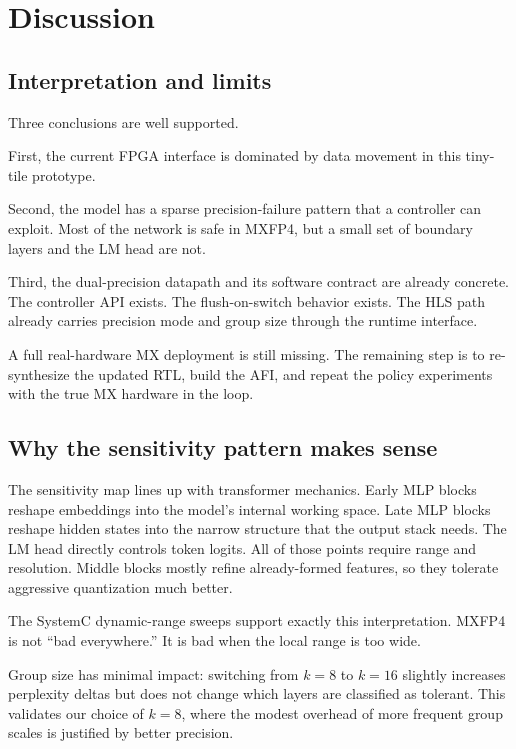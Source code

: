 \documentclass[11pt,a4paper]{article}
\begin{document}
\section{Discussion}

\subsection{Interpretation and limits}

Three conclusions are well supported.

First, the current FPGA interface is dominated by data movement in this tiny-tile prototype.

Second, the model has a sparse precision-failure pattern that a controller can exploit. Most of the network is safe in MXFP4, but a small set of boundary layers and the LM head are not.

Third, the dual-precision datapath and its software contract are already concrete. The controller API exists. The flush-on-switch behavior exists. The HLS path already carries precision mode and group size through the runtime interface.

A full real-hardware MX deployment is still missing. The remaining step is to re-synthesize the updated RTL, build the AFI, and repeat the policy experiments with the true MX hardware in the loop.

\subsection{Why the sensitivity pattern makes sense}

The sensitivity map lines up with transformer mechanics. Early MLP blocks reshape embeddings into the model's internal working space. Late MLP blocks reshape hidden states into the narrow structure that the output stack needs. The LM head directly controls token logits. All of those points require range and resolution. Middle blocks mostly refine already-formed features, so they tolerate aggressive quantization much better.

The SystemC dynamic-range sweeps support exactly this interpretation. MXFP4 is not ``bad everywhere.'' It is bad when the local range is too wide.

Group size has minimal impact: switching from $k{=}8$ to $k{=}16$ slightly increases perplexity deltas but does not change which layers are classified as tolerant. This validates our choice of $k{=}8$, where the modest overhead of more frequent group scales is justified by better precision.
\end{document}
